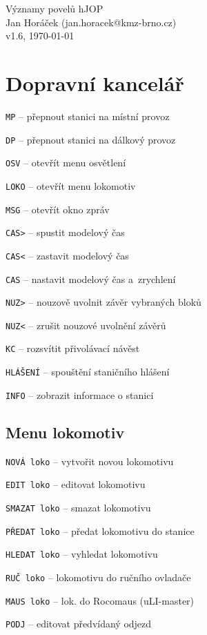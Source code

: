 \documentclass[12pt,a4paper,landscape]{article}
\begin{document}
\begin{multicols}{3}

\begin{center}
\LARGE Významy povelů hJOP\\
\small Jan Horáček (jan.horacek@kmz-brno.cz)\\
v1.6, \today
\end{center}

\section{Dopravní kancelář}
\begin{compactitem}
	\item \texttt{MP} -- přepnout stanici na místní provoz
	\item \texttt{DP} -- přepnout stanici na dálkový provoz
	\item \texttt{OSV} -- otevřít menu osvětlení
	\item \texttt{LOKO} -- otevřít menu lokomotiv
	\item \texttt{MSG} -- otevřít okno zpráv
	\item \texttt{CAS>} -- spustit modelový čas
	\item \texttt{CAS<} -- zastavit modelový čas
	\item \texttt{CAS} -- nastavit modelový čas	a~zrychlení
	\item \texttt{NUZ>} -- nouzově uvolnit závěr vybraných bloků
	\item \texttt{NUZ<} -- zrušit nouzové uvolnění závěrů
	\item \texttt{KC} -- rozsvítit přivolávací návěst
	\item \texttt{HLÁŠENÍ} -- spouštění staničního hlášení	
	\item \texttt{INFO} -- zobrazit informace o stanici
\end{compactitem}

\subsection{Menu lokomotiv}
\begin{compactitem}
	\item \texttt{NOVÁ loko} -- vytvořit novou lokomotivu
	\item \texttt{EDIT loko} -- editovat lokomotivu
	\item \texttt{SMAZAT loko} -- smazat lokomotivu
	\item \texttt{PŘEDAT loko} -- předat lokomotivu do stanice
	\item \texttt{HLEDAT loko} -- vyhledat lokomotivu
	\item \texttt{RUČ loko} -- lokomotivu do ručního ovladače
	\item \texttt{MAUS loko} -- lok. do Rocomaus (uLI-master)
	\item \texttt{PODJ} -- editovat předvídaný odjezd
\end{compactitem}


\end{multicols}
\end{document}
